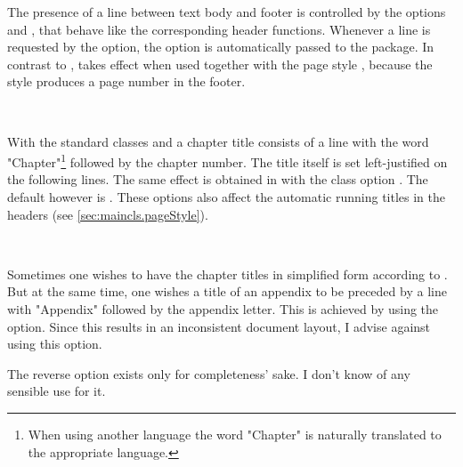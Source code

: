 The presence of a line between text body and footer is controlled by
the options  and , that
behave like the corresponding header functions. Whenever a line is
requested by the  option, the 
option is automatically passed to the  package. In
contrast to ,  takes effect
when used together with the page style , because the
 style produces a page number in the footer.
%
%
%
%
%


\begin{Declaration}
  \\
\end{Declaration}%
%
%
With the standard
classes  and  a chapter
title consists of a line with the word
"Chapter"\footnote{When using another language the word
  "Chapter" is naturally translated to the appropriate language.}%
followed by the chapter number. The title itself is set left-justified
on the following lines. The same effect is obtained in \KOMAScript{}
with the class option . The default however is
. These options also affect the automatic
running titles in the headers (see
\autoref{sec:maincls.pageStyle}).
%
%
%


\begin{Declaration}
  \\
\end{Declaration}%
%
%
Sometimes one wishes to
have the chapter titles in simplified form according to
. But at the same time, one wishes a title of
an appendix to be preceded by a line with "Appendix"
followed by the appendix letter. This is achieved by using the
 option. Since this results in an inconsistent
document layout, I advise against using this option.

The reverse option  exists only for
completeness' sake. I don't know of any sensible use for it.
%
%
%


